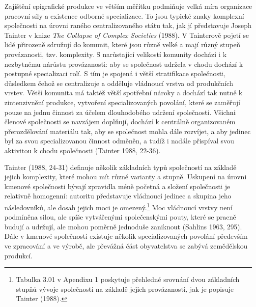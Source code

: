 Zajištění epigrafické produkce ve větším měřítku podmiňuje velká míra organizace pracovní síly a existence odborné specializace. To jsou typické znaky komplexní společnosti na úrovni raného centralizovaného státu tak, jak jí představuje Joseph Tainter v knize {\em The Collapse of Complex Societies} (1988). V Tainterově pojetí se lidé přirozeně sdružují do komunit, které jsou různě velké a mají různý stupeň provázanosti, tzv. komplexity. S narůstající velikostí komunity dochází i k nezbytnému nárůstu provázanosti: aby se společnost udržela v chodu dochází k postupné specializaci rolí. S tím je spojená i větší stratifikace společnosti, důsledkem čehož se centralizuje a odděluje vládnoucí vrstva od produkčních vrstev. Větší komunita má taktéž větší spotřební nároky a dochází tak nutně k zintenzivnění produkce, vytvoření specializovaných povolání, které se zaměřují pouze na jednu činnost za účelem dlouhodobého udržení společnosti. Všichni členové společnosti se navzájem doplňují, dochází k centrálně organizovaném přerozdělování materiálu tak, aby se společnost mohla dále rozvíjet, a aby jedinec byl za svou specializovanou činnost odměněn, a tudíž i nadále přispíval svou aktivitou k chodu společnosti (Tainter 1988, 22-36).

Tainter (1988, 24-31) definuje několik základních typů společností na základě jejich komplexity, které mohou mít různé varianty a stupně. Uskupení na úrovni kmenové společnosti bývají zpravidla méně početná a složení společnosti je relativně homogenní: autoritu představuje vládnoucí jedinec a skupina jeho následovníků, ale dosah jejich moci je omezený.\footnote{Tabulka 3.01 v Apendixu 1 poskytuje přehledné srovnání dvou základních stupňů vývoje společnosti na základě jejich provázanosti, jak je popisuje Tainter (1988).} Moc vládnoucí vrstvy není podmíněna silou, ale spíše vytvářenými společenskými pouty, které se pracně budují a udržují, ale mohou poměrně jednoduše zaniknout (Sahlins 1963, 295). Dále v kmenové společnosti existuje několik specializovaných povolání především ve zpracování a ve výrobě, ale převážná část obyvatelstva se zabývá zemědělskou produkcí.

